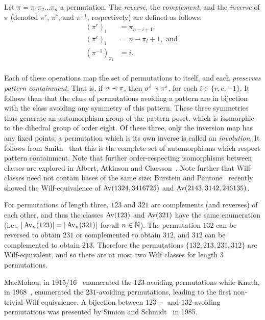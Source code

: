     \begin{definition} \label{prelim:def:symmetries}
      Let $\pi = \pi_1 \pi_2 \dots \pi_n$ a permutation. The
      \emph{reverse}, the \emph{complement}, and the \emph{inverse} of $\pi$
      (denoted $\pi^r$, $\pi^c$, and $\pi^{-1}$, respectively) are defined as
      follows:
      $$ \begin{aligned}
        \left(\pi^r\right)_i &= \pi_{n-i + 1}, \\
        \left(\pi^c\right)_i &= n - \pi_{i} + 1, \text{ and } \\
        \left(\pi^{-1}\right)_{\pi_i} &= i. \\
      \end{aligned} $$
    \end{definition}
    
    Each of these operations map the set of permutations to itself, and each
    \emph{preserves pattern containment}. That is, if $\sigma \prec \pi$, then
    $\sigma^i \prec \pi^i$, for each $i \in \{r, c, -1\}$. It follows than that
    the class of permutations avoiding a pattern are in bijection with the
    class avoiding any symmetry of this pattern. These three symmetries
    thus generate an automorphism group of the pattern poset, which is
    isomorphic to the dihedral group of order eight. Of these three, only the
    inversion map has any fixed points; a permutation which is its own inverse
    is called an \emph{involution}.  It follows from Smith~\cite{Smith2006}
    that this is the complete set of automorphisms which respect pattern
    containment. Note that further order-respecting isomorphisms between classes
    are explored in Albert, Atkinson and Claesson~\cite{Claesson2013}. Note
    further that Wilf-classes need not contain bases of the same size: 
    Burstein and Pantone~\cite{pantone2014} recently showed the
    Wilf-equivalence of $\operatorname{{Av}}(1324, 3416725)$ and 
    $\operatorname{{Av}}(2143,3142,246135)$. 

    For permutations of length three, $123$ and $321$ are complements (and
    reverses) of each other, and thus the classes $\operatorname{{Av}}(123)$ and $\operatorname{{Av}}(321)$ 
    have the same enumeration (i.e., $|\operatorname{{Av}}_n(123)| = |\operatorname{{Av}}_n(321)|$ for all $n
    \in \mathbb{N}$). The permutation $132$ can be reversed to obtain $231$ or
    complemented to obtain $312$, and $312$ can be complemented to obtain
    $213$. Therefore the permutations $\{132, 213, 231, 312\}$ are
    Wilf-equivalent, and so there are at most two Wilf classes for length $3$
    permutations. 

    MacMahon, in 1915/16~\cite{PercyBook} enumerated the $123$-avoiding
    permutations while Knuth, in 1968~\cite{Knuth}, enumerated the
    $231$-avoiding permutations, leading to the first non-trivial Wilf
    equivalence. A bijection between $123-$ and $132$-avoiding permutations was
    presented by Simion and Schmidt~\cite{Simion1985} in 1985.

